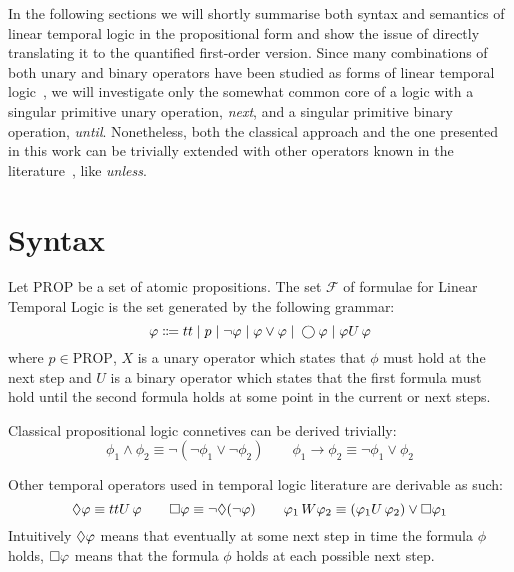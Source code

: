 In the following sections we will shortly summarise both syntax and semantics of linear temporal logic in the
propositional form and show the issue of directly translating it to the quantified first-order version. Since many
combinations of both unary and binary operators have been studied as forms of linear temporal
logic~\cite{pnueli_temporal_1977,gabbay_temporal_1994}, we will investigate only the somewhat common core of a logic
with a singular primitive unary operation, \emph{next}, and a singular primitive binary operation, \emph{until}.
Nonetheless, both the classical approach and the one presented in this work can be trivially extended with other
operators known in the literature~\cite{kroger_temporal_2008}, like \emph{unless}.

\section{Syntax}

\begin{definition}
  Let $\text{PROP}$ be a set of atomic propositions. The set $\mathcal{F}$ of formulae for Linear Temporal Logic is the
  set generated by the following grammar:
  \[
    \varphi \Coloneqq tt \;|\; p
                      \;|\; \neg\varphi
                      \;|\; \varphi \lor \varphi
                      \;|\; \bigcirc{\varphi}
                      \;|\; {\varphi}U\,{\varphi}
  \]
  where $p \in \text{PROP}$, $X$ is a unary operator which states that $\phi$ must hold at the next step and $U$ is a
  binary operator which states that the first formula must hold until the second formula holds at some point in the
  current or next steps.
\end{definition}

Classical propositional logic connetives can be derived trivially:
\[
  \phi_1 \land \phi_2 \equiv \neg(\neg\phi_1 \lor \neg\phi_2) \qquad
  \phi_1 \to \phi_2 \equiv \neg\phi_1 \lor \phi_2
\]

Other temporal operators used in temporal logic literature are derivable as such:
\[
  \Diamond{\varphi} \equiv {tt}U\,{\varphi} \qquad
  \Box{\varphi} \equiv \neg\Diamond{(}\neg\varphi) \qquad
  {\varphi_1}\,W {\varphi_2} \equiv ({\varphi_1}U\,{\varphi_2}) \lor \Box{\varphi_1}
\]
Intuitively $\Diamond{\varphi}$ means that eventually at some next step in time the formula $\phi$ holds,
$\Box{\varphi}$ means that the formula $\phi$ holds at each possible next step.

